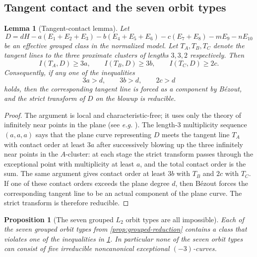 \documentclass[11pt]{article}
\newtheorem{proposition}[proposition]{Proposition}
\newtheorem{lemma}[lemma]{Lemma}
\theoremstyle{definition}
\newcommand{\eg}{\emph{e.g.}}
\begin{document}
\subsection{Tangent contact and the seven orbit types}

\begin{lemma}[Tangent-contact lemma]\label{lem:tangent-contact}
Let
\[
D=dH-a(E_1+E_2+E_3)-b(E_4+E_5+E_6)-c(E_7+E_8)-mE_9-nE_{10}
\]
be an effective grouped class in the normalized model. Let $T_A,T_B,T_C$ denote the tangent lines to the three proximate clusters of lengths $3,3,2$ respectively. Then
\[
I(T_A,D)\ge 3a,
\qquad
I(T_B,D)\ge 3b,
\qquad
I(T_C,D)\ge 2c.
\]
Consequently, if any one of the inequalities
\[
3a>d,
\qquad
3b>d,
\qquad
2c>d
\]
holds, then the corresponding tangent line is forced as a component by B\'ezout, and the strict transform of $D$ on the blowup is reducible.
\end{lemma}

\begin{proof}
The argument is local and characteristic-free; it uses only the theory of infinitely near points in the plane (see \eg{} \cite[\S3.3]{CasasAlvero00}). The length-$3$ multiplicity sequence $(a,a,a)$ says that the plane curve representing $D$ meets the tangent line $T_A$ with contact order at least $3a$ after successively blowing up the three infinitely near points in the $A$-cluster: at each stage the strict transform passes through the exceptional point with multiplicity at least $a$, and the total contact order is the sum. The same argument gives contact order at least $3b$ with $T_B$ and $2c$ with $T_C$. If one of these contact orders exceeds the plane degree $d$, then B\'ezout forces the corresponding tangent line to be an actual component of the plane curve. The strict transform is therefore reducible.\qedhere
\end{proof}

\begin{proposition}[The seven grouped $L_2$ orbit types are all impossible]\label{prop:seven-orbits}
Each of the seven grouped orbit types from \cref{prop:grouped-reduction} contains a class that violates one of the inequalities in \cref{lem:tangent-contact}. In particular none of the seven orbit types can consist of five irreducible noncanonical exceptional $(-3)$-curves.
\end{proposition}
\end{document}
